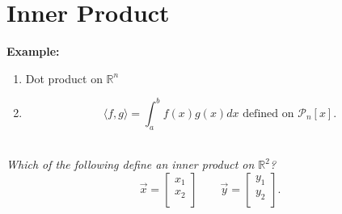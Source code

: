 \documentclass{report}
\begin{document}
 \section{Inner Product }
 \textbf{Example:} \\
 \begin{enumerate}[label=(\arabic*).]  
   \item Dot product on $ \mathbb{R} ^{n}$ 
   \item \[
   \langle f,g  \rangle = \int_{a}^{b} f \left( x  \right) g \left( x  \right) dx \text{ defined on } \mathcal{P} _{n} \left[ x \right] 
   .\] 
 \end{enumerate}
  \\
  \textit{Which of the following define an inner product on $ \mathbb{R} ^{2}$?}\\
  \[
  \vec{ x} = \begin{bmatrix}
  x_1\\
  x_2\\
  \end{bmatrix}
   \qquad  \vec{ y} = \begin{bmatrix}
   y_1\\
   y_2\\
   \end{bmatrix}
   
  .\] 
\end{document}
